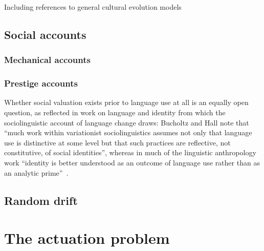 Including references to general cultural evolution models

\subsection{Social accounts}

\subsubsection{Mechanical accounts}


\subsubsection{Prestige accounts}



Whether social valuation exists prior to language use at all is an equally open question, as reflected in work on language and identity from which the sociolinguistic account of language change draws: Bucholtz and Hall note that ``much work within variationist sociolinguistics assumes not only that language use is distinctive at some level but that such practices are reflective, not constitutive, of social identities'', whereas in much of the linguistic anthropology work ``identity is better understood as an outcome of language use rather than as an analytic prime''~\citep[p.376]{Bucholtz2004}.

\subsection{Random drift}


\section{The actuation problem}


